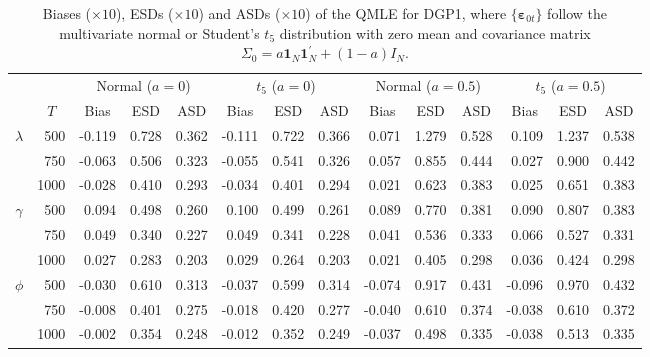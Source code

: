 \begin{table}[htbp]
	\centering
	\renewcommand{\arraystretch}{1.3}
	\caption{\label{tab_DGP1}Biases ($\times 10$), ESDs ($\times 10$) and ASDs ($\times 10$) of the QMLE for DGP1, where $\{\bm \varepsilon_{0t}\}$ follow the multivariate normal or Student's $t_5$ distribution with zero mean and covariance matrix $\Sigma_0 =   a \bm 1_N \bm 1_N^\prime + (1-a)I_N $.}
	\begin{adjustbox}{width=\textwidth}
		\begin{tabular}{crrrrrrrrrrrrr}
			\toprule
			&       & \multicolumn{3}{c}{Normal ($a=0$)} & \multicolumn{3}{c}{$t_5$ ($a=0$)} & \multicolumn{3}{c}{Normal ($a=0.5$)} & \multicolumn{3}{c}{$t_5$ ($a=0.5$)} \\
			\cmidrule(lr){3-5} \cmidrule(lr){6-8} \cmidrule(lr){9-11} \cmidrule(lr){12-14} 
			& \multicolumn{1}{c}{$T$} & \multicolumn{1}{c}{Bias} & \multicolumn{1}{c}{ESD} & \multicolumn{1}{c}{ASD} & \multicolumn{1}{c}{Bias} & \multicolumn{1}{c}{ESD} & \multicolumn{1}{c}{ASD} & \multicolumn{1}{c}{Bias} & \multicolumn{1}{c}{ESD} & \multicolumn{1}{c}{ASD} & \multicolumn{1}{c}{Bias} & \multicolumn{1}{c}{ESD} & \multicolumn{1}{c}{ASD} \\
			\midrule
 $\lambda$ & 500 & -0.119 & 0.728 & 0.362 & -0.111 & 0.722 & 0.366 & 0.071 & 1.279 & 0.528 & 0.109 & 1.237 & 0.538 \\
 & 750 & -0.063 & 0.506 & 0.323 & -0.055 & 0.541 & 0.326 & 0.057 & 0.855 & 0.444 & 0.027 & 0.900 & 0.442 \\
 & 1000 & -0.028 & 0.410 & 0.293 & -0.034 & 0.401 & 0.294 & 0.021 & 0.623 & 0.383 & 0.025 & 0.651 & 0.383 \\
$\gamma$ & 500 & 0.094 & 0.498 & 0.260 & 0.100 & 0.499 & 0.261 & 0.089 & 0.770 & 0.381 & 0.090 & 0.807 & 0.383 \\
 & 750 & 0.049 & 0.340 & 0.227 & 0.049 & 0.341 & 0.228 & 0.041 & 0.536 & 0.333 & 0.066 & 0.527 & 0.331 \\
 & 1000 & 0.027 & 0.283 & 0.203 & 0.029 & 0.264 & 0.203 & 0.021 & 0.405 & 0.298 & 0.036 & 0.424 & 0.298 \\
$\phi$ & 500 & -0.030 & 0.610 & 0.313 & -0.037 & 0.599 & 0.314 & -0.074 & 0.917 & 0.431 & -0.096 & 0.970 & 0.432 \\
 & 750 & -0.008 & 0.401 & 0.275 & -0.018 & 0.420 & 0.277 & -0.040 & 0.610 & 0.374 & -0.038 & 0.610 & 0.372 \\
 & 1000 & -0.002 & 0.354 & 0.248 & -0.012 & 0.352 & 0.249 & -0.037 & 0.498 & 0.335 & -0.038 & 0.513 & 0.335 \\

\end{tabular}
\end{adjustbox}
\end{table}
